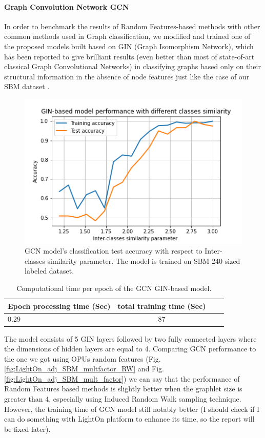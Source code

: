\paragraph{Graph Convolution Network GCN}
In order to benchmark the results of Random Features-based methods with other common methods used in Graph classification, we modified and trained one of the proposed models built based on GIN (Graph Isomorphism Network), which has been reported to give brilliant results (even better than most of state-of-art classical Graph Convolutional Networks) in classifying graphs based only on their structural information in the absence of node features just like the case of our SBM dataset \citep{GCN_powerful}. 

\begin{figure}[H]
\centering
\includegraphics[scale=0.7]{LatexDiss/Dissertation/figs/GNN_GIN.png}

\caption[GCN model's classification test accuracy as a function of Inter-classes similarity parameter ]{GCN model's classification test accuracy with respect to Inter-classes similarity parameter. The  model is trained on SBM 240-sized labeled dataset.}
\label{fig:GCN_GIN_SBM_multfactor_RW}
\end{figure}

\begin{table}
\begin{center}
\begin{tabular}{|l|c|c|c|}
\hline
{Epoch processing time (Sec)}  &  {total training time (Sec)} \\
\hline
0.29 & 87  \\
\hline
\end{tabular}
\end{center}
\caption{Computational time per epoch of the GCN GIN-based model.}
\label{table:OPU_multfactor_IRW_time}
\end{table}
The model consists of 5 GIN layers followed by two fully connected layers where the dimensions of hidden layers are equal to 4. Comparing GCN performance to the one we got using OPUs random features (Fig. \ref{fig:LightOn_adj_SBM_multfactor_RW} and Fig. \ref{fig:LightOn_adj_SBM_mult_factor}) we can say that the performance of Random Features based methods is slightly better when the graphlet size is greater than 4, especially using Induced Random Walk sampling technique. However, the training time of GCN model still notably better (I should check if I can do something with LightOn platform to enhance its time, so the report will be fixed later). 


